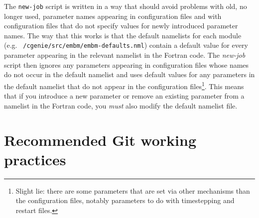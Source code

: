 \documentclass[a4paper,10pt,article]{memoir}
\begin{document}
The \texttt{new-job} script is written in a way that should avoid
problems with old, no longer used, parameter names appearing in
configuration files and with configuration files that do not specify
values for newly introduced parameter names.  The way that this works
is that the default namelists for each module
(e.g. \texttt{~/cgenie/src/embm/embm-defaults.nml}) contain a default
value for every parameter appearing in the relevant namelist in the
Fortran code.  The \emph{new-job} script then ignores any parameters
appearing in configuration files whose names do not occur in the
default namelist and uses default values for any parameters in the
default namelist that do not appear in the configuration
files\footnote{Slight lie: there are some parameters that are set via
  other mechanisms than the configuration files, notably parameters to
  do with timestepping and restart files.}.  This means that if you
introduce a new parameter or remove an existing parameter from a
namelist in the Fortran code, you \emph{must} also modify the default
namelist file.

\section{Recommended Git working practices}
\label{sec:git-practices}
\end{document}
